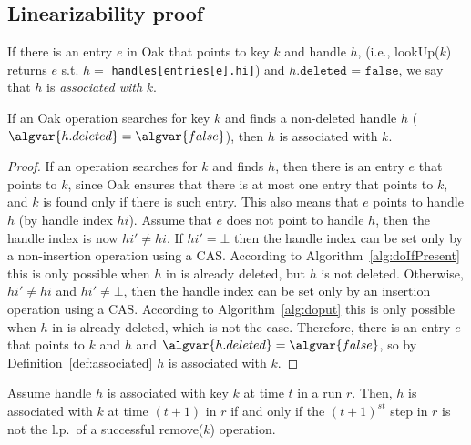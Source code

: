 \subsection{Linearizability proof}

\begin{definition}
\label{def:associated}
If there is an entry $e$ in Oak that points to key $k$ and handle $h$, (i.e., lookUp($k$) returns $e$ s.t. \newline $h=$ \texttt{handles[entries[e].hi]}) and $h\texttt{.deleted = false}$, we say that $h$ is \emph{associated with} $k$.
\end{definition}

\begin{claim}
\label{claim:deleted}
If an Oak operation searches for key $k$ and finds a non-deleted handle $h$ ($\algvar{h.deleted}=\algvar{false}$), then $h$ is associated with $k$.
\end{claim}

\begin{proof}
If an operation searches for $k$ and finds $h$, then there is an entry $e$ that points to $k$, since Oak ensures that there is at most one entry that points to $k$, and $k$ is found only if there is such entry.
This also means that $e$ points to handle $h$ (by handle index $hi$). 
Assume that $e$ does not point to handle $h$, then the handle index is now $hi' \neq hi$.
If $hi'=\bot$ then the handle index can be set only by a non-insertion operation using a CAS. According to Algorithm~\ref{alg:doIfPresent} this is only possible when $h$ in  is already deleted, but $h$ is not deleted.
Otherwise, $hi' \neq hi$ and $hi' \neq \bot$, then the handle index can be set only by an insertion operation using a CAS. According to Algorithm~\ref{alg:doput} this is only possible when $h$ in  is already deleted, which is not the case.
Therefore, there is an entry $e$ that points to $k$ and $h$ and $\algvar{h.deleted}=\algvar{false}$, so by Definition~\ref{def:associated} $h$ is associated with $k$.
\end{proof}

\begin{claim}
\label{claim:remove}
Assume handle $h$ is associated with key $k$ at time $t$ in a run $r$.
Then, $h$ is associated with $k$ at time $(t+1)$ in $r$ if and only if the $(t+1)^{st}$ step in $r$ is not the l.p.\ of a successful remove($k$) operation.
\end{claim}

